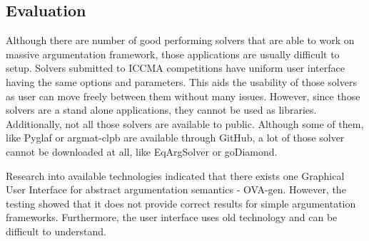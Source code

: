 \subsection{Evaluation}
Although there are number of good performing solvers that are able to work on massive argumentation framework, those applications are usually difficult to setup. Solvers submitted to ICCMA competitions have uniform user interface having the same options and parameters. This aids the usability of those solvers as user can move freely between them without many issues. However, since those solvers are a stand alone applications, they cannot be used as libraries. Additionally, not all those solvers are available to public. Although some of them, like Pyglaf or argmat-clpb are available through GitHub, a lot of those solver cannot be downloaded at all, like EqArgSolver or goDiamond.


Research into available technologies indicated that there exists one Graphical User Interface for abstract argumentation semantics - OVA-gen. However, the testing showed that it does not provide correct results for simple argumentation frameworks. Furthermore, the user interface uses old technology and can be difficult to understand.